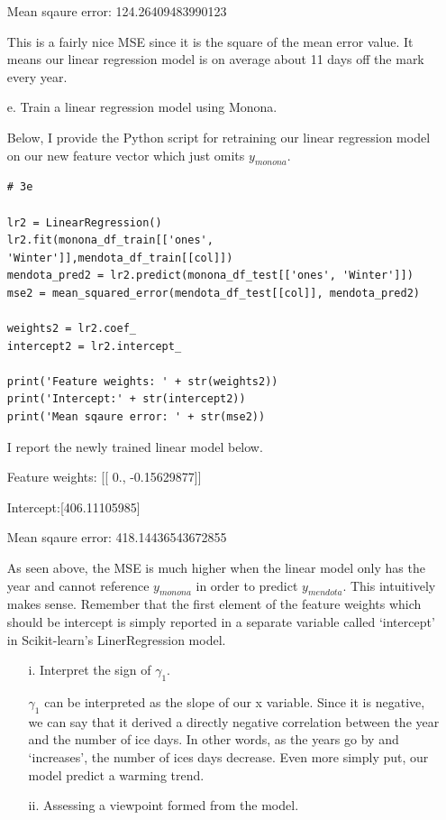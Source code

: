 \documentclass[12pt]{report}
\begin{document}
\begin{enumerate}
Mean sqaure error: 124.26409483990123

This is a fairly nice MSE since it is the square of the mean error value. It
means our linear regression model is on average about 11 days off the mark every
year.

\item[e.] Train a linear regression model using Monona.

  Below, I provide the Python script for retraining our linear regression model
  on our new feature vector which just omits $y_{monona}$.
\begin{verbatim}
# 3e

lr2 = LinearRegression()
lr2.fit(monona_df_train[['ones', 'Winter']],mendota_df_train[[col]])
mendota_pred2 = lr2.predict(monona_df_test[['ones', 'Winter']])
mse2 = mean_squared_error(mendota_df_test[[col]], mendota_pred2)

weights2 = lr2.coef_
intercept2 = lr2.intercept_

print('Feature weights: ' + str(weights2))
print('Intercept:' + str(intercept2))
print('Mean sqaure error: ' + str(mse2))
\end{verbatim}

I report the newly trained linear model below.

Feature weights: [[ 0., -0.15629877]]

Intercept:[406.11105985]

Mean sqaure error: 418.14436543672855

As seen above, the MSE is much higher when the linear model only has the year
and cannot reference $y_{monona}$ in order to predict $y_{mendota}$. This
intuitively makes sense. Remember that the first element of the feature weights
which should be intercept is simply reported in a separate variable called
`intercept' in Scikit-learn's LinerRegression model.

  \begin{itemize}
  \item[i.] Interpret the sign of $\gamma_1$.

    $\gamma_1$ can be interpreted as the slope of our x variable. Since it is
    negative, we can say that it derived a directly negative correlation between
    the year and the number of ice days. In other words, as the years go by and
    `increases', the number of ices days decrease. Even more simply put, our
    model predict a warming trend.
  \item[ii.] Assessing a viewpoint formed from the model.


\end{itemize}
\end{enumerate}
\end{document}
